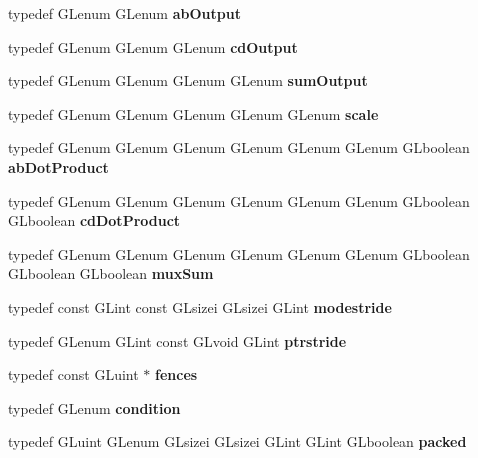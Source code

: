 \begin{DoxyCompactItemize}
\item 
typedef G\+Lenum G\+Lenum {\bfseries ab\+Output}\label{_s_d_l__opengl_8h_ae40bf1daeca8fbc317eb46964c1451e8}

\item 
typedef G\+Lenum G\+Lenum G\+Lenum {\bfseries cd\+Output}\label{_s_d_l__opengl_8h_aa8917040eb1ccf925b7f2ef21a3b18ee}

\item 
typedef G\+Lenum G\+Lenum G\+Lenum G\+Lenum {\bfseries sum\+Output}\label{_s_d_l__opengl_8h_aa7ae35809d7514d06d2260d713ed45d1}

\item 
typedef G\+Lenum G\+Lenum G\+Lenum G\+Lenum G\+Lenum {\bfseries scale}\label{_s_d_l__opengl_8h_a281421b881aa7a1266842b73a3bc7655}

\item 
typedef G\+Lenum G\+Lenum G\+Lenum G\+Lenum G\+Lenum G\+Lenum G\+Lboolean {\bfseries ab\+Dot\+Product}\label{_s_d_l__opengl_8h_a0aeebbcb74fc17c5b33b0e00c044e6b3}

\item 
typedef G\+Lenum G\+Lenum G\+Lenum G\+Lenum G\+Lenum G\+Lenum G\+Lboolean G\+Lboolean {\bfseries cd\+Dot\+Product}\label{_s_d_l__opengl_8h_a24af9ee71c286d2df0f68a2c503ff96b}

\item 
typedef G\+Lenum G\+Lenum G\+Lenum G\+Lenum G\+Lenum G\+Lenum G\+Lboolean G\+Lboolean G\+Lboolean {\bfseries mux\+Sum}\label{_s_d_l__opengl_8h_a674394192718069c0907bd12ac434c4a}

\item 
typedef const G\+Lint const G\+Lsizei G\+Lsizei G\+Lint {\bfseries modestride}\label{_s_d_l__opengl_8h_a949604a522cd5fb00632d480a579880e}

\item 
typedef G\+Lenum G\+Lint const G\+Lvoid G\+Lint {\bfseries ptrstride}\label{_s_d_l__opengl_8h_a723f77c092f9e8f44d8883932a64bfdf}

\item 
typedef const G\+Luint $\ast$ {\bfseries fences}\label{_s_d_l__opengl_8h_a91edcae3a89d999c4bdc87398fee9451}

\item 
typedef G\+Lenum {\bfseries condition}\label{_s_d_l__opengl_8h_a3fd7759b3d6e5284475eee14a613b9f9}

\item 
typedef G\+Luint G\+Lenum G\+Lsizei G\+Lsizei G\+Lint G\+Lint G\+Lboolean {\bfseries packed}\label{_s_d_l__opengl_8h_ae1a14bfbe53957836e1fa28741e673af}


\end{DoxyCompactItemize}
